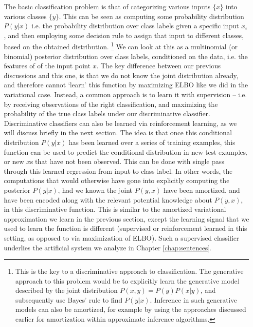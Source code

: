 The basic classification problem is that of categorizing various inputs $\{x\}$ into various classes $\{y\}$. This can be seen as computing some probability distribution $P(y | x)$ i.e. the probability distribution over class labels given a specific input $x_i$, and then employing some decision rule to assign that input to different classes, based on the obtained distribution. \footnote{This is the key to a discriminative approach to classification. The generative approach to this problem would be to explicitly learn the generative model described by the joint distribution $P(x, y) = P(y) P(x | y)$, and subsequently use Bayes' rule to find $P(y | x)$.  Inference in such generative models can also be amortized, for example by using the approaches discussed earlier for amortization within approximate inference algorithms. } We can look at this as a multinomial (or binomial) posterior distribution over class labels, conditioned on the data, i.e. the features of of the input point $x$. The key difference between our previous discussions and this one, is that we do not know the joint distribution already, and therefore cannot `learn' this function by maximizing ELBO like we did in the variational case. Instead, a common approach is to learn it with supervision -- i.e. by receiving observations of the right classification, and maximizing the probability of the true class labels under our discriminative classifier. Discriminative classifiers can also be learned via reinforcement learning, as we will discuss briefly in the next section. The idea is that once this conditional distribution $P(y | x)$ has been learned over a series of training examples, this function can be used to predict the conditional distribution in new test examples, or new $x$s that have not been observed. This can be done with single pass through this learned regression from input to class label. In other words, the computations that would otherwise have gone into explicitly computing the posterior $P(y | x)$, had we known the joint $P(y,x)$ have been amortized, and have been encoded along with  the relevant potential knowledge about $P(y,x)$, in this discriminative function. This is similar to the amortized variational approximation we learn in the previous section, except the learning signal that we used to learn the function is different (supervised or reinforcement learned in this setting, as opposed to via maximization of ELBO). Such a supervised classifier underlies the artificial system we analyze in Chapter \ref{chap:sentences}.

